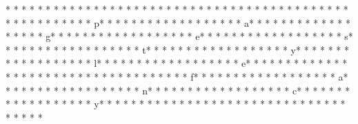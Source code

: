 * * *  * * *  * * *  *  * * *  *  * * *  * %
* * *  * * *  * * *  *  * * *  *  * * *  * 
* * *  * * *  * * *  *  * * *  *  * * *  * p* * *  * * *  * * *  *  * * *  *  * * *  * a* * *  * * *  * * *  *  * * *  *  * * *  * g* * *  * * *  * * *  *  * * *  *  * * *  * e* * *  * * *  * * *  *  * * *  *  * * *  * s* * *  * * *  * * *  *  * * *  *  * * *  * t* * *  * * *  * * *  *  * * *  *  * * *  * y* * *  * * *  * * *  *  * * *  *  * * *  * l* * *  * * *  * * *  *  * * *  *  * * *  * e* * *  * * *  * * *  *  * * *  *  * * *  * {* * *  * * *  * * *  *  * * *  *  * * *  * f* * *  * * *  * * *  *  * * *  *  * * *  * a* * *  * * *  * * *  *  * * *  *  * * *  * n* * *  * * *  * * *  *  * * *  *  * * *  * c* * *  * * *  * * *  *  * * *  *  * * *  * y* * *  * * *  * * *  *  * * *  *  * * *  * }* * *  * * *  * * *  *  * * *  *  * * *  * 
